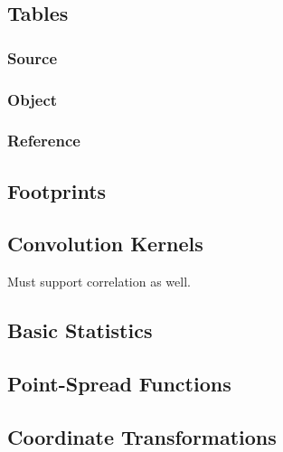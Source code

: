 \subsection{Tables}
\label{sec:spTables}

\subsubsection{Source}
\label{sec:spTablesSource}

\subsubsection{Object}
\label{sec:spTablesObject}

\subsubsection{Reference}
\label{sec:spTablesReference}

\subsection{Footprints}
\label{sec:spFootprints}

\subsection{Convolution Kernels}
\label{sec:spKernels}
Must support correlation as well.

\subsection{Basic Statistics}
\label{sec:spStatistics}

\subsection{Point-Spread Functions}
\label{sec:spPSF}

\subsection{Coordinate Transformations}
\label{sec:spWCS}

